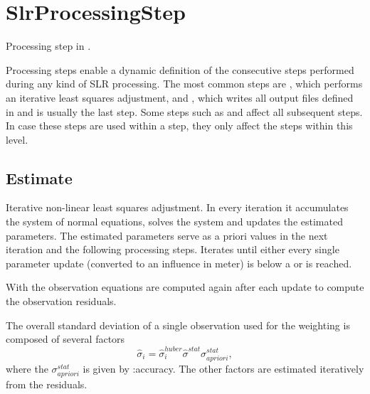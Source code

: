 \clearpage

\section{SlrProcessingStep}\label{slrProcessingStepType}
Processing step in .

Processing steps enable a dynamic definition of the consecutive steps performed during any kind of SLR processing.
The most common steps are , which performs an iterative least
squares adjustment, and , which writes all output files
defined in  and is usually the last step.
Some steps such as 
and  affect all subsequent steps.
In case these steps are used within a  step,
they only affect the steps within this level.


\subsection{Estimate}\label{slrProcessingStepType:estimate}
Iterative non-linear least squares adjustment.
In every iteration it accumulates the system of normal equations, solves the system and updates the estimated parameters.
The estimated parameters serve as a priori values in the next iteration and the following processing steps.
Iterates until either every single parameter update (converted to an influence in meter)
is below a  or  is reached.

With  the observation equations are computed
again after each update to compute the observation residuals.

The overall standard deviation of a single observation used for the weighting
is composed of several factors
\begin{equation}
  \hat{\sigma}_i = \hat{\sigma}_i^{huber} \hat{\sigma}^{stat} \sigma_{apriori}^{stat},
\end{equation} where the $\sigma_{apriori}^{stat}$ is given by :accuracy.
The other factors are estimated iteratively from the residuals.

